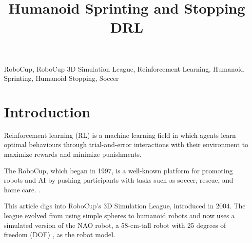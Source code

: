 \documentclass[conference]{IEEEtran}
\begin{document}
\title{Humanoid Sprinting and Stopping DRL}

\author{

    \and

    \and

}


\maketitle

\begin{abstract}

\end{abstract}

\begin{IEEEkeywords}
RoboCup, RoboCup 3D Simulation League, Reinforcement Learning, Humanoid Sprinting, Humanoid Stopping, Soccer
\end{IEEEkeywords}

\section{Introduction}

Reinforcement learning (RL) is a machine learning field in which agents learn optimal behaviours through trial-and-error interactions with their environment to maximize rewards and minimize punishments.

The RoboCup, which began in 1997, is a well-known platform for promoting robots and AI by pushing participants with tasks such as soccer, rescue, and home care. \cite{robocup97}.

This article digs into RoboCup's 3D Simulation League, introduced in 2004. The league evolved from using simple spheres to humanoid robots and now uses a simulated version of the NAO robot, a 58-cm-tall robot with 25 degrees of freedom (DOF) \cite{naorobot}, as the robot model.
\end{document}
